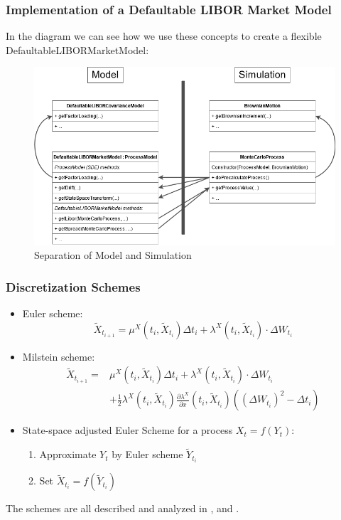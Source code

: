 \documentclass{beamer}
\begin{document}
	\begin{frame}
		\frametitle{Implementation of a Defaultable LIBOR Market Model}
		In the diagram we can see how we use these concepts to create a flexible DefaultableLIBORMarketModel:
		\begin{figure}
			\centering
			\includegraphics[width=0.7\linewidth]{ClassDiagramDefaultableLIBORMarketModel}
			\caption{Separation of Model and Simulation}
			\label{fig:classdiag}
		\end{figure}
		
	\end{frame}
	\begin{frame}
		\frametitle{Discretization Schemes}
		\begin{itemize}
			\item Euler scheme:
			\[\tilde{X}_{t_{i+1}} = \mu^X(t_i, \tilde{X}_{t_i}) \Delta t_i + \lambda^X(t_i, \tilde{X}_{t_i}) \cdot \Delta W_{t_i}\]
			\item Milstein scheme:
			\begin{align*}
			\tilde{X}_{t_{i+1}} = &\mu^X(t_i, \tilde{X}_{t_i}) \Delta t_i + \lambda^X(t_i, \tilde{X}_{t_i}) \cdot \Delta W_{t_i}\\
			& + \frac{1}{2}\lambda^X(t_i, \tilde{X}_{t_i})  \frac{\partial \lambda^X}{\partial x}(t_i, \tilde{X}_{t_i})((\Delta W_{t_i})^2 - \Delta t_i)
			\end{align*}
			\item State-space adjusted Euler Scheme for a process $X_t = f(Y_t)$:
			\begin{enumerate}
				\item Approximate $Y_t$ by Euler scheme $\tilde{Y}_{t_i}$
				\item Set $\tilde{X}_{t_i} = f(\tilde{Y}_{t_i})$
			\end{enumerate}
		\end{itemize}
		The schemes are all described and analyzed in \cite{kloedenSchemes}, \cite{FriesBook} and \cite{finmathWebsite}.
	\end{frame}
	
\end{document}
